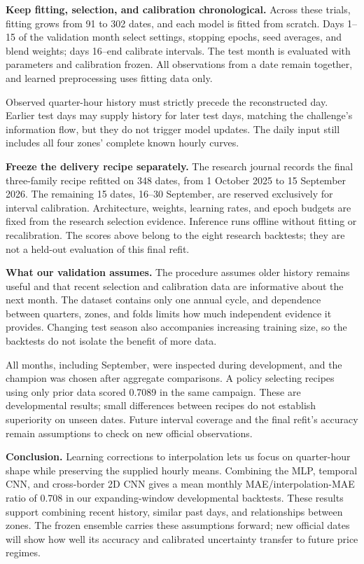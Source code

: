 \documentclass[11pt,a4paper]{article}
\newcommand{\runin}[1]{\textbf{#1}\enspace}
\begin{document}
\runin{Keep fitting, selection, and calibration chronological.}
Across these trials, fitting grows from 91 to 302 dates, and each model is
fitted from scratch. Days 1--15 of the validation month select settings,
stopping epochs, seed averages, and blend weights; days 16--end calibrate
intervals. The test month is evaluated with parameters and calibration frozen.
All observations from a date remain together, and learned preprocessing uses
fitting data only.

Observed quarter-hour history must strictly precede the reconstructed day.
Earlier test days may supply history for later test days, matching the
challenge's information flow, but they do not trigger model updates.
The daily input still includes all four zones' complete known hourly curves.

\runin{Freeze the delivery recipe separately.}
The research journal records the final three-family recipe refitted on
348 dates, from 1 October 2025 to 15 September 2026. The remaining 15 dates,
16--30 September, are reserved exclusively for interval calibration.
Architecture, weights, learning rates, and epoch budgets are fixed from the
research selection evidence. Inference runs offline without fitting or
recalibration. The scores above belong to the eight research backtests;
they are not a held-out evaluation of this final refit.

\runin{What our validation assumes.}
The procedure assumes older history remains useful and that recent selection
and calibration data are informative about the next month. The dataset
contains only one annual cycle, and dependence between quarters, zones, and
folds limits how much independent evidence it provides. Changing test season
also accompanies increasing training size, so the backtests do not isolate
the benefit of more data.

All months, including September, were inspected during development, and the
champion was chosen after aggregate comparisons. A policy selecting recipes
using only prior data scored 0.7089 in the same campaign. These are
developmental results; small differences between recipes do not establish
superiority on unseen dates. Future interval coverage and the final refit's
accuracy remain assumptions to check on new official observations.

\runin{Conclusion.}
Learning corrections to interpolation lets us focus on quarter-hour shape
while preserving the supplied hourly means. Combining the MLP, temporal CNN,
and cross-border 2D CNN gives a mean monthly MAE/interpolation-MAE ratio of
0.708 in our expanding-window developmental backtests. These results support
combining recent history, similar past days, and relationships between zones.
The frozen ensemble carries these assumptions forward; new official dates
will show how well its accuracy and calibrated uncertainty transfer to future
price regimes.
\end{document}
